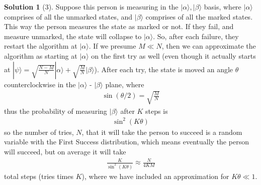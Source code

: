 \documentclass[11pt]{article}
\theoremstyle{definition}
\newtheorem*{solution}{Solution}
\newcommand{\eq}{\begin{equation}\begin{aligned}}
\newcommand{\qe}{\end{aligned}\end{equation}}
\newcommand{\ket}[1]{|#1\rangle}
\begin{document}
\begin{solution}[3]
  Suppose this person is measuring in the $\ket{\alpha},\ket{\beta}$ basis, where $\ket{\alpha}$ comprises of all the unmarked states, and $\ket{\beta}$ comprises of all the marked states. This way the person measures the state as marked or not. If they fail, and measure unmarked, the state will collapse to $\ket{\alpha}$. So, after each failure, they restart the algorithm at $\ket{\alpha}$. If we presume $M\ll N$, then we can approximate the algorithm as starting at $\ket{\alpha}$ on the first try as well (even though it actually starts at $\ket{\psi}=\sqrt{\frac{N-M}{N}}\ket{\alpha}+\sqrt{\frac{M}{N}}\ket{\beta}$). After each try, the state is moved an angle $\theta$ counterclockwise in the $\ket{\alpha}$ - $\ket{\beta}$ plane, where 
  \eq
    \sin(\theta/2)=\sqrt{\frac{M}{N}}
  \qe
  thus the probability of measuring $\ket{\beta}$ after $K$ steps is
  \eq
    \sin^2(K\theta)
  \qe
  so the number of tries, $N$, that it will take the person to succeed is a random variable with the First Success distribution, which means eventually the person will succeed, but on average it will take
  \eq
    \boxed{\frac{K}{\sin^2(K\theta)}\approx \frac{N}{4KM}}
  \qe
  total steps (tries times $K$), where we have included an approximation for $K\theta\ll 1$.
\end{solution}
\end{document}
